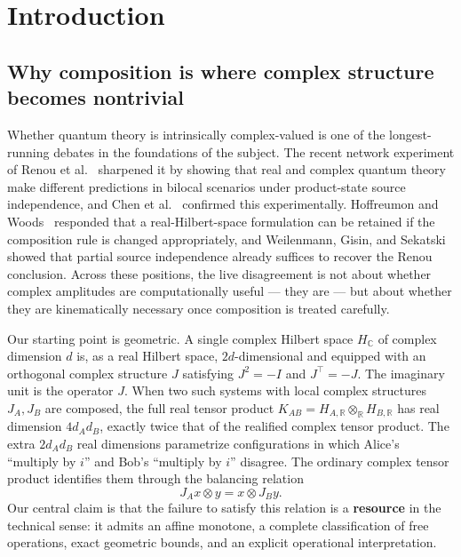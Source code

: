 \documentclass[a4paper,onecolumn,noarxiv]{quantumarticle}
\theoremstyle{plain}
\theoremstyle{definition}
\theoremstyle{remark}
\newcommand{\R}{\mathbb{R}}
\newcommand{\C}{\mathbb{C}}
\newcommand{\HC}{H_{\C}}
\newcommand{\KAB}{K_{AB}}
\begin{document}
\section{Introduction}
\label{sec:intro}

\subsection{Why composition is where complex structure becomes nontrivial}
\label{ssec:whycomposition}

Whether quantum theory is intrinsically complex-valued is one of the
longest-running debates in the foundations of the subject. The recent network
experiment of Renou et al.~\cite{Renou2021RealQT} sharpened it by showing that
real and complex quantum theory make different predictions in bilocal scenarios
under product-state source independence, and Chen et al.~\cite{ChenRulingOut2022}
confirmed this experimentally. Hoffreumon and Woods~\cite{HoffreumonWoods2025,%
HoffreumonWoodsNonFalsified} responded that a real-Hilbert-space formulation can
be retained if the composition rule is changed appropriately, and Weilenmann,
Gisin, and Sekatski~\cite{WeilenmannGisinSekatski2025} showed that partial source
independence already suffices to recover the Renou conclusion. Across these
positions, the live disagreement is not about whether complex amplitudes are
computationally useful --- they are --- but about whether they are kinematically
necessary once composition is treated carefully.

Our starting point is geometric. A single complex Hilbert space $\HC$ of complex
dimension $d$ is, as a real Hilbert space, $2d$-dimensional and equipped with an
orthogonal complex structure $J$ satisfying $J^2=-I$ and $J^\top=-J$. The
imaginary unit is the operator $J$. When two such systems with local complex
structures $J_A, J_B$ are composed, the full real tensor product $\KAB =
H_{A,\R}\otimes_\R H_{B,\R}$ has real dimension $4d_Ad_B$, exactly twice that of
the realified complex tensor product. The extra $2d_Ad_B$ real dimensions
parametrize configurations in which Alice's ``multiply by $i$'' and Bob's
``multiply by $i$'' disagree. The ordinary complex tensor product identifies them
through the balancing relation
\begin{equation}
  J_A x\otimes y = x\otimes J_B y.
  \label{eq:balancing}
\end{equation}
Our central claim is that the failure to satisfy this relation is a \textbf{resource}
in the technical sense: it admits an affine monotone, a complete classification of
free operations, exact geometric bounds, and an explicit operational interpretation.
\end{document}
